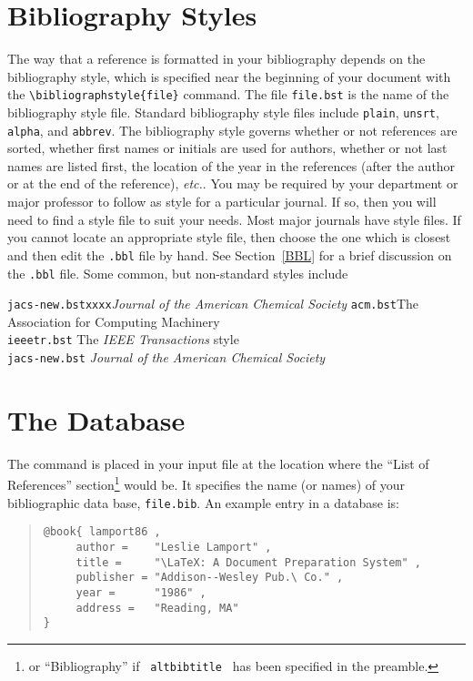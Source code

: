 \section{Bibliography Styles}
The way that a reference is formatted in your bibliography depends on the bibliography
style, which is specified near the beginning of your document with the\break
{\tt \verb|\bibliographstyle{file}|} command.  The file {\tt file.bst} is the name of the 
bibliography style file.  Standard \BibTeX{} bibliography style files include {\tt plain},
{\tt unsrt}, {\tt alpha}, and {\tt abbrev}.  The bibliography style governs whether or not
references are sorted, whether first names or initials are used for authors, whether or 
not last names are listed first, the location of the year in the references (after the
author or at the end of the reference), {\em etc.}.  You may be required by your
department or major professor to follow as style for a particular journal.  If so, then you
will need to find a \BibTeX{} style file to suit your needs.  Most major journals have
style files.  If you cannot locate an appropriate \BibTeX{} style file, then choose the
one which is closest and then edit the {\tt .bbl} file by hand.  See Section~\ref{BBL}
for a brief discussion on the {\tt .bbl} file.  Some common, but non-standard \BibTeX{}
styles include
\begin{tabbing}
{\tt jacs-new.bstxxxx}\= {\em Journal of the American Chemical Society}\kill
{\tt acm.bst}\>The Association for Computing Machinery\\
{\tt ieeetr.bst}\> The {\em IEEE Transactions} style\\
{\tt jacs-new.bst}\> {\em Journal of the American Chemical Society}
\end{tabbing}

\section{The Database}
The  {\tt \verb||} command is placed in your input file at the location
where the ``List of References'' section\footnote{or ``Bibliography'' 
if {\tt {} altbibtitle } has been specified in the preamble.} would be.  It specifies the name (or names) of
your bibliographic data base, {\tt file.bib}.  An example entry in a \BibTeX{}
database is:
\begin{quote}\singlespace\tt\begin{verbatim}
@book{ lamport86 ,
     author =    "Leslie Lamport" ,
     title =     "\LaTeX: A Document Preparation System" ,
     publisher = "Addison--Wesley Pub.\ Co." ,
     year =      "1986" ,
     address =   "Reading, MA" 
}
\end{verbatim}\end{quote}

